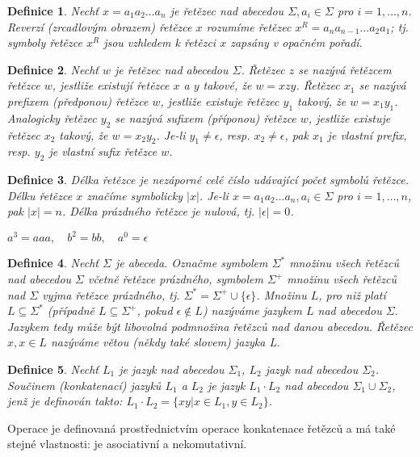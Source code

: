 \documentclass[a4paper, 11pt]{report}
\newtheorem{mydef}{Definice}[chapter]
\begin{document}
\begin{mydef}
Nechť $x = a_1 a_2 \dots a_n$ je řetězec nad abecedou $\Sigma, a_i \in \Sigma$ pro $i = 1, \dots, n$. \emph{Reverzí} (zrcadlovým obrazem) řetězce $x$ rozumíme řetězec $x^R = a_n a_{n-1} \dots a_2 a_1$; tj. symboly řetězce $x^R$ jsou vzhledem k řetězci $x$ zapsány v opačném pořadí.
\end{mydef}

\begin{mydef}
Nechť $w$ je řetězec nad abecedou $\Sigma$. Řetězec $z$ se nazývá \emph{řetězcem} řetězce $w$, jestliže existují řetězce $x$ a $y$ takové, že $w = xzy$.
Řetězec $x_1$ se nazývá \emph{prefixem} (předponou) řetězce $w$, jestliže existuje řetězec $y_1$ takový, že $w = x_1 y_1$. Analogicky řetězec $y_2$ se nazývá \emph{sufixem} (příponou) řetězce $w$, jestliže existuje řetězec $x_2$ takový, že $w = x_2 y_2$. Je-li $y_1 \not= \epsilon$, resp. $x_2 \not= \epsilon$, pak $x_1$ je \emph{vlastní prefix}, resp. $y_2$ je vlastní sufix řetězce $w$.
\end{mydef}

\begin{mydef}
\emph{Délka řetězce} je nezáporné celé číslo udávající počet symbolů řetězce. Délku řetězce $x$ značíme symbolicky $|x|$. Je-li $x = a_1 a_2 \dots a_n, a_i \in \Sigma$ pro $i = 1, \dots, n$, pak $|x| = n$. Délka prázdného řetězce je nulová, tj. $|\epsilon| = 0$.
\end{mydef}

$a^3 = aaa, \quad b^2 = bb, \quad a^0 = \epsilon$

\begin{mydef}
Nechť $\Sigma$ je abeceda. Označme symbolem $\Sigma^*$ množinu všech řetězců nad abecedou $\Sigma$ včetně řetězce prázdného, symbolem $\Sigma^+$ množinu všech řetězců nad $\Sigma$ vyjma řetězce prázdného, tj. $\Sigma^* = \Sigma^+ \cup \{\epsilon\}$. Množinu $L$, pro niž platí $L \subseteq \Sigma^*$ (případně $L \subseteq \Sigma^+$, pokud $\epsilon \not\in L$) nazýváme \emph{jazykem} $L$ nad abecedou $\Sigma$. Jazykem tedy může být libovolná podmnožina řetězců nad danou abecedou. Řetězec $x, x \in L$ nazýváme \emph{větou} (někdy také slovem) jazyka L.
\end{mydef}

\begin{mydef}
Nechť $L_1$ je jazyk nad abecedou $\Sigma_1$, $L_2$ jazyk nad abecedou $\Sigma_2$. \emph{Součinem} (konkatenací) jazyků $L_1$ a $L_2$ je jazyk $L_1 \cdot L_2$ nad abecedou $\Sigma_1 \cup \Sigma_2$, jenž je definován takto: $L_1 \cdot L_2 = \{ xy | x \in L_1, y \in L_2\}$.
\end{mydef}
Operace je definovaná prostřednictvím operace konkatenace řetězců a má také stejné vlastnosti: je asociativní a nekomutativní.
\end{document}
